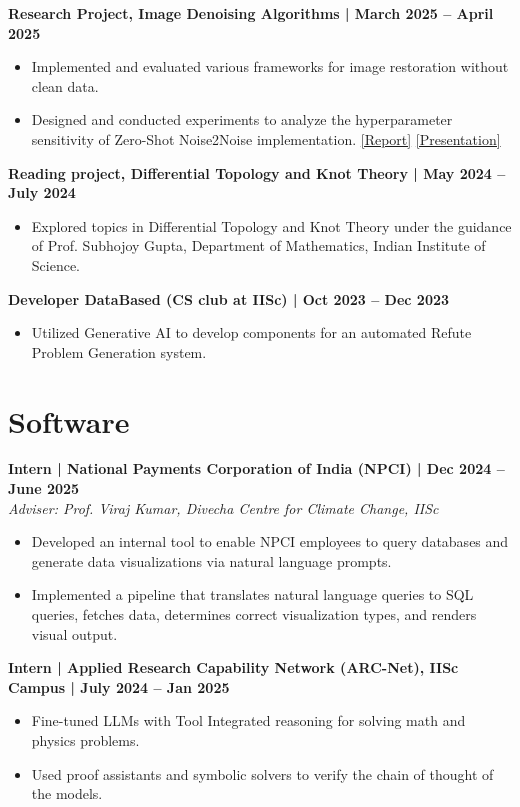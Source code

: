 \documentclass[a4paper,10pt]{article}
\newcommand{\role}[4]{
    \noindent \textbf{#1 | #3 | #2} \\
    \textit{#4}
}
\begin{document}
\vspace{3pt}
\noindent \textbf{Research Project, Image Denoising Algorithms | March 2025 -- April 2025}
\begin{itemize}
    \item Implemented and evaluated various frameworks for image restoration without clean data.
    \item Designed and conducted experiments to analyze the hyperparameter sensitivity of Zero-Shot Noise2Noise implementation. \href{https://omar826.github.io/noise_report.pdf}{[Report]} \href{https://omar826.github.io/noise_presentation.pdf}{[Presentation]}
\end{itemize}

\vspace{3pt}
\noindent \textbf{Reading project, Differential Topology and Knot Theory | May 2024 -- July 2024}
\begin{itemize}
    \item Explored topics in Differential Topology and Knot Theory under the guidance of Prof. Subhojoy Gupta, Department of Mathematics, Indian Institute of Science.
\end{itemize}

\vspace{3pt}
\noindent \textbf{Developer DataBased (CS club at IISc) | Oct 2023 -- Dec 2023}
\begin{itemize}
    \item Utilized Generative AI to develop components for an automated Refute Problem Generation system.
\end{itemize}

\section*{Software}
\role{Intern}{Dec 2024 -- June 2025}{National Payments Corporation of India (NPCI)}{Adviser: Prof. Viraj Kumar, Divecha Centre for Climate Change, IISc}
\begin{itemize}
    \item Developed an internal tool to enable NPCI employees to query databases and generate data visualizations via natural language prompts.
    \item Implemented a pipeline that translates natural language queries to SQL queries, fetches data, determines correct visualization types, and renders visual output.
\end{itemize}

\vspace{5pt}
\role{Intern}{July 2024 -- Jan 2025}{Applied Research Capability Network (ARC-Net), IISc Campus}{}
\begin{itemize}
    \item Fine-tuned LLMs with Tool Integrated reasoning for solving math and physics problems.
    \item Used proof assistants and symbolic solvers to verify the chain of thought of the models.
\end{itemize}
\end{document}
